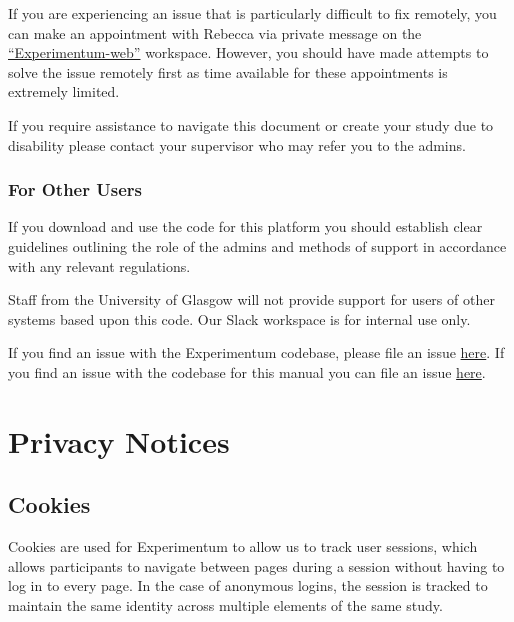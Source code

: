 \documentclass[]{book}
\begin{document}
If you are experiencing an issue that is particularly difficult to fix remotely, you can make an appointment with Rebecca via private message on the \href{https://experimentum-web.slack.com/}{``Experimentum-web''} workspace. However, you should have made attempts to solve the issue remotely first as time available for these appointments is extremely limited.

If you require assistance to navigate this document or create your study due to disability please contact your supervisor who may refer you to the admins.

\hypertarget{for-other-users}{%
\subsubsection*{For Other Users}\label{for-other-users}}

If you download and use the code for this platform you should establish clear guidelines outlining the role of the admins and methods of support in accordance with any relevant regulations.

Staff from the University of Glasgow will not provide support for users of other systems based upon this code. Our Slack workspace is for internal use only.

If you find an issue with the Experimentum codebase, please file an issue \href{https://github.com/debruine/experimentum/issues}{here}. If you find an issue with the codebase for this manual you can file an issue \href{https://github.com/RebeccaJLai/exp_manual/issues}{here}.

\hypertarget{privacy-notices}{%
\section*{Privacy Notices}\label{privacy-notices}}

\hypertarget{cookies}{%
\subsection*{Cookies}\label{cookies}}

Cookies are used for Experimentum to allow us to track user sessions, which allows participants to navigate between pages during a session without having to log in to every page. In the case of anonymous logins, the session is tracked to maintain the same identity across multiple elements of the same study.
\end{document}
